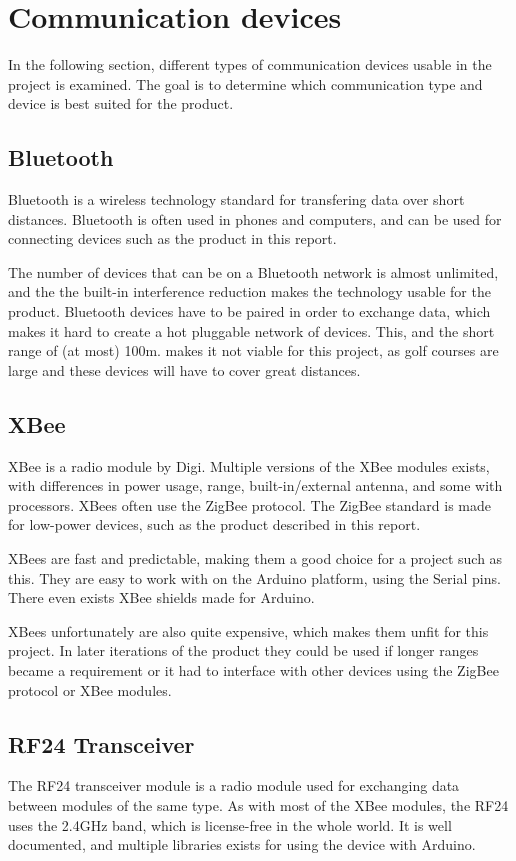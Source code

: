 \section{Communication devices}
In the following section, different types of communication devices usable in the project is examined. The goal is to determine which communication type and device is best suited for the product.

\subsection{Bluetooth}
Bluetooth is a wireless technology standard for transfering data over short distances. Bluetooth is often used in phones and computers, and can be used for connecting devices such as the product in this report.

The number of devices that can be on a Bluetooth network is almost unlimited, and the the built-in interference reduction makes the technology usable for the product.
Bluetooth devices have to be paired in order to exchange data, which makes it hard to create a hot pluggable network of devices. This, and the short range of (at most) 100m\cite{bluetoothbasics}. makes it not viable for this project, as golf courses are large and these devices will have to cover great distances.

\subsection{XBee}
XBee is a radio module by Digi. Multiple versions of the XBee modules exists, with differences in power usage, range, built-in/external antenna, and some with processors\cite{sparkfunXbeeGuide}.
XBees often use the ZigBee protocol. The ZigBee standard is made for low-power devices, such as the product described in this report\cite{zigbee}.

XBees are fast and predictable, making them a good choice for a project such as this. They are easy to work with on the Arduino platform, using the Serial pins. There even exists XBee shields made for Arduino.

XBees unfortunately are also quite expensive, which makes them unfit for this project. In later iterations of the product they could be used if longer ranges became a requirement or it had to interface with other devices using the ZigBee protocol or XBee modules.


\subsection{RF24 Transceiver}
The RF24 transceiver module is a radio module used for exchanging data between modules of the same type. As with most of the XBee modules, the RF24 uses the 2.4GHz band, which is license-free in the whole world. It is well documented, and multiple libraries exists for using the device with Arduino.


